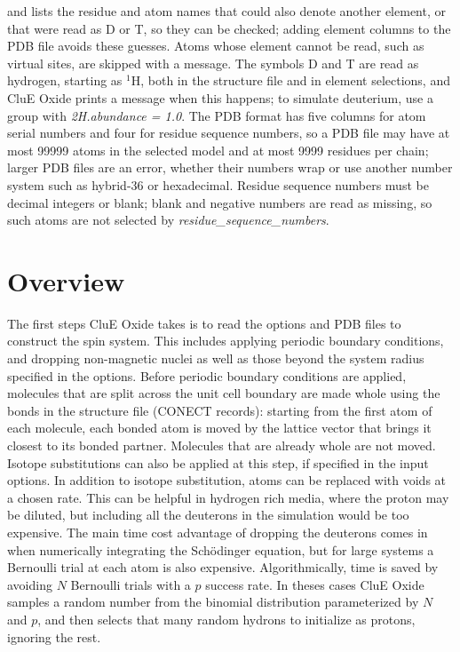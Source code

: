 \documentclass{book}
\begin{document}
and lists the residue and atom names that could also denote another element,
or that were read as D or T, so they can be checked;
adding element columns to the PDB file avoids these guesses.
Atoms whose element cannot be read, such as virtual sites, are skipped
with a message.
The symbols D and T are read as hydrogen, starting as $^1$H, both in the 
structure file and in element selections, and CluE Oxide prints a message
when this happens; to simulate deuterium, use a group with
\textit{2H.abundance = 1.0}.
The PDB format has five columns for atom serial numbers and four for
residue sequence numbers, so a PDB file may have at most 99999 atoms in the
selected model and at most 9999 residues per chain; larger PDB files are an
error, whether their numbers wrap or use another number system such as
hybrid-36 or hexadecimal.
Residue sequence numbers must be decimal integers or blank; blank and
negative numbers are read as missing, so such atoms are not selected by
\textit{residue\_sequence\_numbers}.
\section{Overview}
The first steps CluE Oxide takes is to read the options and PDB files to construct
the spin system.  This includes applying periodic boundary conditions, and
dropping non-magnetic nuclei as well as those beyond the system radius 
specified in the options.  
Before periodic boundary conditions are applied, molecules that are split
across the unit cell boundary are made whole using the bonds in the 
structure file (CONECT records):
starting from the first atom of each molecule, each bonded atom is moved by
the lattice vector that brings it closest to its bonded partner.
Molecules that are already whole are not moved.  Isotope substitutions can also be applied at this
step, if specified in the input options.  In addition to isotope substitution,
atoms can be replaced with voids at a chosen rate.  
This can be helpful in hydrogen rich media,
where the proton may be diluted, but including all the deuterons in the
simulation would be too expensive.  The main time cost advantage of dropping 
the deuterons comes in when numerically integrating the Sch{\"o}dinger 
equation, but for large systems a Bernoulli trial at each atom is also
expensive.  Algorithmically, time is saved by avoiding $N$ Bernoulli trials
with a $p$ success rate.  In theses cases CluE Oxide samples a random
number from the binomial distribution parameterized by $N$ and $p$, and then 
selects that many random hydrons to initialize as protons, ignoring the rest.     
\end{document}
